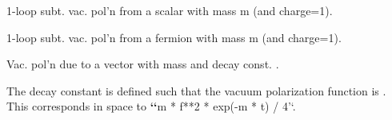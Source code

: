 \documentclass[letterpaper,10pt,english]{sphinxmanual}
\begin{document}
\begin{fulllineitems}
\begin{fulllineitems}
\end{fulllineitems}


\begin{fulllineitems}
\label{\detokenize{g2tools:g2tools.vacpol.scalar}}
1-loop subt. vac. pol’n from a scalar with mass m (and charge=1).

\end{fulllineitems}


\begin{fulllineitems}
\label{\detokenize{g2tools:g2tools.vacpol.fermion}}
1-loop subt. vac. pol’n from a fermion with mass m (and charge=1).

\end{fulllineitems}


\begin{fulllineitems}
\label{\detokenize{g2tools:g2tools.vacpol.vector}}
Vac. pol’n due to a vector with mass  and decay const. .

The decay constant is defined such that the vacuum polarization
function is . This
corresponds in  space to {\color{red}\bfseries{}{}`{}`}m * f**2 * exp(-m * t) / 4’‘.

\end{fulllineitems}


\end{fulllineitems}

\end{document}
